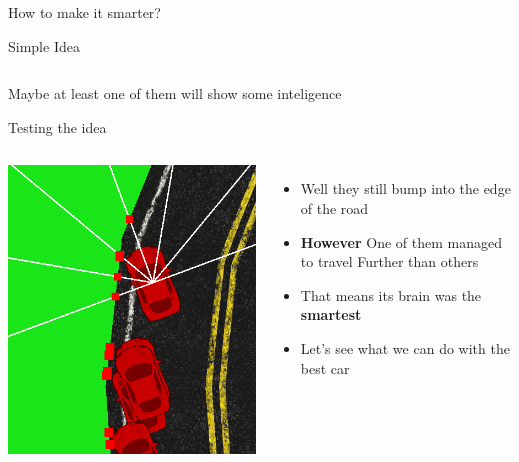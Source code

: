 \documentclass{do}
\begin{document}
\begin{frame}{How to make it smarter?}
\begin{exampleblock}{Simple Idea}
\begin{tabular}{c|c|c|c|c|c|c|c}
        \end{tabular}
        Maybe at least one of them will show some inteligence
    \end{exampleblock}
    \begin{block}{Testing the idea}
        \begin{columns}
        \column{.24\textheight}
        \includegraphics[width=1.3\linewidth]{evolution.png}
        \column{.76\textheight}
        \footnotesize
            \begin{itemize}
                \item Well they still bump into the edge of the road
                \item \textbf{However} One of them managed to travel Further than others
                \item That means its brain was the \textbf{smartest}
                \item Let’s see what we can do with the best car
            \end{itemize}
   
    \end{columns}
    \end{block}

\end{frame}
\end{document}
